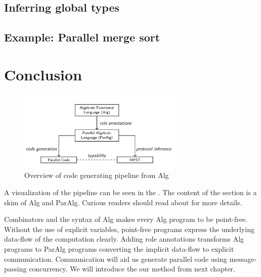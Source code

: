 \subsection{Inferring global types}
\subsection{Example: Parallel merge sort}
\section{Conclusion}
\begin{figure}[ht]
    \centering
    \includegraphics[width=0.7\textwidth]{project/pipeline.png}
    \caption{Overview of code generating pipeline from Alg\cite{AlgebraicMultipartyProtocol}}
    \label{project:fig:pipeline}
\end{figure}
A visualization of the pipeline can be seen in the . The content of the section is a skim of Alg and ParAlg. Curious readers should read about \cite{AlgebraicMultipartyProtocol} for more details.

Combinators and the syntax of Alg makes every Alg program to be point-free. Without the use of explicit variables, point-free programs express the underlying data-flow of the computation clearly. Adding role annotations transforms Alg programs to ParAlg programs converting the implicit data-flow to explicit communication. Communication will aid us generate parallel code using message-passing concurrency. We will introduce the our method from next chapter.  